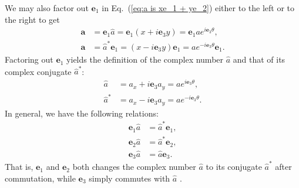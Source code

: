 \documentclass[twocolumn,showpacs,preprintnumbers,amsmath,amssymb]{revtex4}
\begin{document}
We may also factor out $\mathbf e_1$ in Eq.~(\ref{eq:a is xe_1 + ye_2}) either to the left or to the right to get
\begin{subequations}
\begin{align}
\mathbf a &= \mathbf e_1\hat a = \mathbf e_1(x +  i \mathbf e_3  y) = \mathbf e_1 ae^{ i \mathbf e_3 \theta},\\
\mathbf a &= \hat a^*\mathbf e_1 = (x -  i \mathbf e_3  y)\mathbf e_1 = ae^{- i \mathbf e_3 \theta}\mathbf e_1.
\end{align}
\end{subequations}
Factoring out $\mathbf e_1$ yields the definition of the complex number $\hat a$ and that of its complex conjugate $\hat a^*$:
\begin{subequations}
\begin{align}
\hat a &= a_x +  i \mathbf e_3  a_y = ae^{ i \mathbf e_3 \theta},\\
\hat a^* &= a_x -  i \mathbf e_3  a_y = ae^{- i \mathbf e_3 \theta}.
\end{align}
\end{subequations}
In general, we have the following relations:
\begin{subequations}
\begin{align}
\label{eq:e_1a is a*e_1}
\mathbf e_1\hat a &= \hat a^*\mathbf e_1,\\
\label{eq:e_2a is a*e_2}
\mathbf e_2\hat a &= \hat a^*\mathbf e_2,\\
\label{eq:e_3a is ae_3}
\mathbf e_3\hat a &= \hat a\mathbf e_3.
\end{align}
\end{subequations}
That is, $\mathbf e_1$ and $\mathbf e_2$ both changes the complex number $\hat a$ to its conjugate $\hat a^*$ after commutation, while $\mathbf e_3$ simply commutes with $\hat a$ \cite{jancewicz, geomaloptics, vold, hestenesoersted}.
\end{document}
